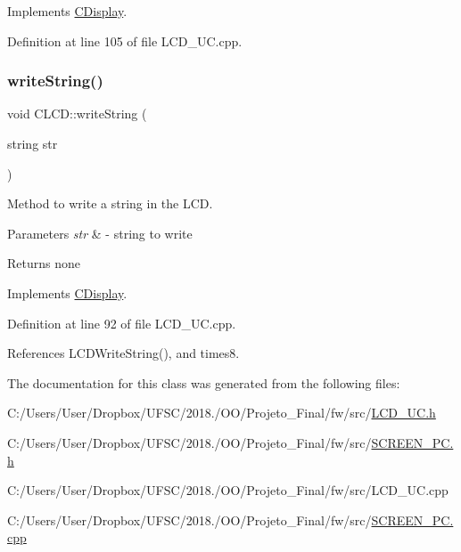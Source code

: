 Implements \mbox{\hyperlink{class_c_display}{C\+Display}}.



Definition at line 105 of file L\+C\+D\+\_\+\+U\+C.\+cpp.

\mbox{\label{class_c_l_c_d_a48bc8230b2cef435c7972fd3e9522711}} 
\subsubsection{\texorpdfstring{write\+String()}{writeString()}}
{\footnotesize\ttfamily void C\+L\+C\+D\+::write\+String (\begin{DoxyParamCaption}\item[{string}]{str }\end{DoxyParamCaption})\hspace{0.3cm}{\ttfamily [virtual]}}



Method to write a string in the L\+CD. 


\begin{DoxyParams}{Parameters}
{\em str} & -\/ string to write \\
\hline
\end{DoxyParams}
\begin{DoxyReturn}{Returns}
none 
\end{DoxyReturn}


Implements \mbox{\hyperlink{class_c_display}{C\+Display}}.



Definition at line 92 of file L\+C\+D\+\_\+\+U\+C.\+cpp.



References L\+C\+D\+Write\+String(), and times8.



The documentation for this class was generated from the following files\+:\begin{DoxyCompactItemize}
\item 
C\+:/\+Users/\+User/\+Dropbox/\+U\+F\+S\+C/2018./\+O\+O/\+Projeto\+\_\+\+Final/fw/src/\mbox{\hyperlink{_l_c_d___u_c_8h}{L\+C\+D\+\_\+\+U\+C.\+h}}\item 
C\+:/\+Users/\+User/\+Dropbox/\+U\+F\+S\+C/2018./\+O\+O/\+Projeto\+\_\+\+Final/fw/src/\mbox{\hyperlink{_s_c_r_e_e_n___p_c_8h}{S\+C\+R\+E\+E\+N\+\_\+\+P\+C.\+h}}\item 
C\+:/\+Users/\+User/\+Dropbox/\+U\+F\+S\+C/2018./\+O\+O/\+Projeto\+\_\+\+Final/fw/src/L\+C\+D\+\_\+\+U\+C.\+cpp\item 
C\+:/\+Users/\+User/\+Dropbox/\+U\+F\+S\+C/2018./\+O\+O/\+Projeto\+\_\+\+Final/fw/src/\mbox{\hyperlink{_s_c_r_e_e_n___p_c_8cpp}{S\+C\+R\+E\+E\+N\+\_\+\+P\+C.\+cpp}}\end{DoxyCompactItemize}
